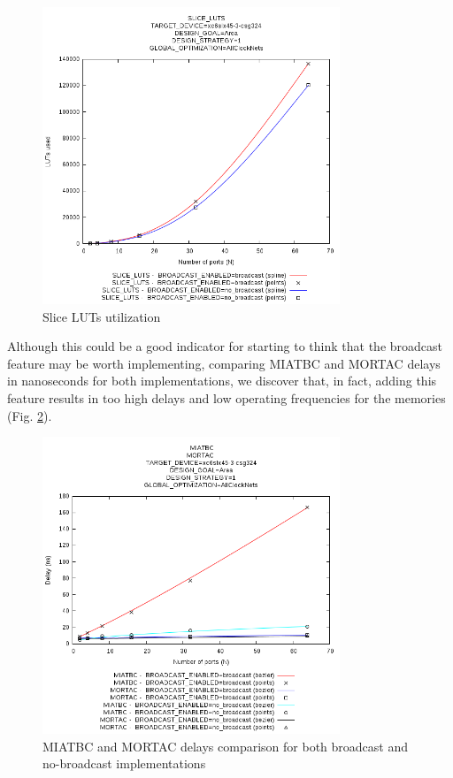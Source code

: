 \documentclass[conference,a4paper]{IEEEtran}
\begin{document}
\begin{figure}[h]
\centering
\includegraphics[width=3.5in]{luts}
\caption{Slice LUTs utilization}
\label{luts}
\end{figure}

Although this could be a good indicator for starting to think that the broadcast feature may be worth implementing, comparing MIATBC and MORTAC delays in nanoseconds for both implementations, we discover that, in fact, adding this feature results in too high delays and low operating frequencies for the memories (Fig. \ref{miatbc_vs_mortac}).

\begin{figure}[h]
\centering
\includegraphics[width=3.5in]{miatbc_vs_mortac}
\caption{MIATBC and MORTAC delays comparison for both broadcast and no-broadcast implementations}
\label{miatbc_vs_mortac}
\end{figure}
\end{document}
